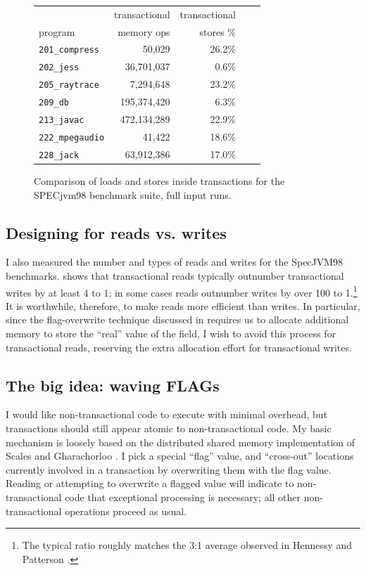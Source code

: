 \begin{figure}\sis%
\begin{center}
\begin{tabular}{lrrrr}
        & transactional & transactional\\
program & memory ops    & stores \% \\\hline
{\tt 201\_compress} & 50,029 & 26.2\% \\
{\tt 202\_jess} & 36,701,037 & 0.6\% \\
{\tt 205\_raytrace} & 7,294,648 & 23.2\% \\
{\tt 209\_db} & 195,374,420 & 6.3\% \\
{\tt 213\_javac} & 472,134,289 & 22.9\% \\
{\tt 222\_mpegaudio} & 41,422 & 18.6\% \\
{\tt 228\_jack} & 63,912,386 & 17.0\% \\
\end{tabular}
\end{center}
\caption{Comparison of loads and stores inside transactions for the
  SPECjvm98 benchmark suite, full input runs.}
\label{fig:writepercent}
\end{figure}
\subsection{Designing for reads vs. writes}
I also measured the number and types of reads and writes for the
SpecJVM98 benchmarks.
 shows that transactional reads typically
outnumber transactional writes by at least 4 to 1; in some cases reads
outnumber writes by over 100 to 1.\footnote{The typical ratio roughly
  matches the 3:1 average observed in Hennessy and Patterson
  \cite[pp. 105, 379]{HennessyPa96}.}  It is worthwhile, therefore, to
make reads more efficient than writes.  In particular, since the
flag-overwrite technique discussed in  requires us
to allocate additional memory to store the ``real'' value of the
field, I wish to avoid this process for transactional reads,
reserving the extra allocation effort for transactional writes.

\subsection{The big idea: waving FLAGs}\label{sec:flagfield}

I would like non-transactional code to execute with minimal overhead,
but transactions should still appear atomic to non-transactional
code.  My basic mechanism is loosely based on the
distributed shared memory implementation of Scales and Gharachorloo
\cite{ScalesGh97}.  I pick a special ``flag'' value, and
``cross-out'' locations currently involved in a transaction by
overwriting them with the flag value.  Reading or attempting to
overwrite a flagged value will indicate to non-transactional code
that exceptional processing is necessary; all other non-transactional
operations proceed as usual.

